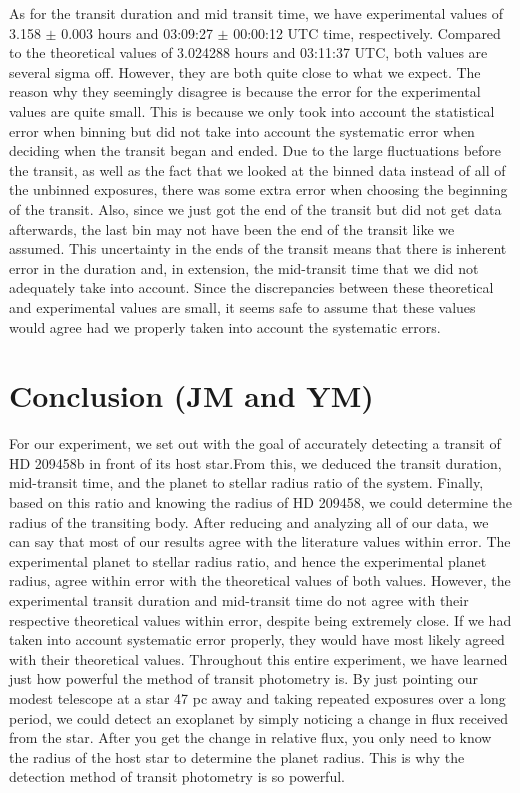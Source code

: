 \documentclass{aastex61}
\begin{document}
As for the transit duration and mid transit time, we have experimental values of 3.158 $\pm$ 0.003 hours and 03:09:27 $\pm$ 00:00:12 UTC time, respectively. Compared to the theoretical values of 3.024288 hours and 03:11:37 UTC, both values are several sigma off. However, they are both quite close to what we expect. The reason why they seemingly disagree is because the error for the experimental values are quite small. This is because we only took into account the statistical error when binning but did not take into account the systematic error when deciding when the transit began and ended. Due to the large fluctuations before the transit, as well as the fact that we looked at the binned data instead of all of the unbinned exposures, there was some extra error when choosing the beginning of the transit. Also, since we just got the end of the transit but did not get data afterwards, the last bin may not have been the end of the transit like we assumed. This uncertainty in the ends of the transit means that there is inherent error in the duration and, in extension, the mid-transit time that we did not adequately take into account. Since the discrepancies between these theoretical and experimental values are small, it seems safe to assume that these values would agree had we properly taken into account the systematic errors.
\section{Conclusion (JM and YM)}
For our experiment, we set out with the goal of accurately detecting a transit of HD 209458b in front of its host star.From this, we deduced the transit duration, mid-transit time, and the planet to stellar radius ratio of the system. Finally, based on this ratio and knowing the radius of HD 209458, we could determine the radius of the transiting body. After reducing and analyzing all of our data, we can say that most of our results agree with the literature values within error. The experimental planet to stellar radius ratio, and hence the experimental planet radius, agree within error with the theoretical values of both values. However, the experimental transit duration and mid-transit time do not agree with their respective theoretical values within error, despite being extremely close. If we had taken into account systematic error properly, they would have most likely agreed with their theoretical values. Throughout this entire experiment, we have learned just how powerful the method of transit photometry is. By just pointing our modest telescope at a star 47 pc away \citep{2010MNRAS.408.1689S} and taking repeated exposures over a long period, we could detect an exoplanet by simply noticing a change in flux received from the star. After you get the change in relative flux, you only need to know the radius of the host star to determine the planet radius. This is why the detection method of transit photometry is so powerful.
\end{document}
